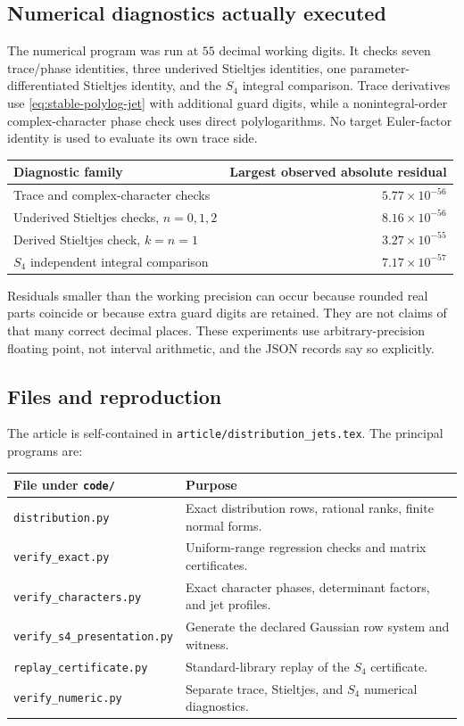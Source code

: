 \documentclass[11pt]{article}
\numberwithin{equation}{section}
\theoremstyle{definition}
\theoremstyle{remark}
\newcommand{\code}[1]{\texttt{\small #1}}
\begin{document}
\subsection{Numerical diagnostics actually executed}
The numerical program was run at $55$ decimal working digits. It checks
seven trace/phase identities, three underived Stieltjes identities, one
parameter-differentiated Stieltjes identity, and the $S_4$ integral
comparison. Trace derivatives use \eqref{eq:stable-polylog-jet} with
additional guard digits, while a nonintegral-order complex-character
phase check uses direct polylogarithms. No target Euler-factor identity
is used to evaluate its own trace side.

\begin{center}
\begin{tabular}{p{}r}
\toprule
Diagnostic family & Largest observed absolute residual\\\midrule
Trace and complex-character checks & $5.77\times10^{-56}$\\
Underived Stieltjes checks, $n=0,1,2$ & $8.16\times10^{-56}$\\
Derived Stieltjes check, $k=n=1$ & $3.27\times10^{-55}$\\
$S_4$ independent integral comparison & $7.17\times10^{-57}$\\
\bottomrule
\end{tabular}
\end{center}

Residuals smaller than the working precision can occur because rounded
real parts coincide or because extra guard digits are retained. They
are not claims of that many correct decimal places. These experiments
use arbitrary-precision floating point, not interval arithmetic, and
the JSON records say so explicitly.

\subsection{Files and reproduction}
The article is self-contained in \code{article/distribution\_jets.tex}.
The principal programs are:
\begin{center}
\begin{tabular}{p{}p{}}
\toprule
File under \code{code/} & Purpose\\\midrule
\code{distribution.py} & Exact distribution rows, rational ranks, finite normal forms.\\
\code{verify\_exact.py} & Uniform-range regression checks and matrix certificates.\\
\code{verify\_characters.py} & Exact character phases, determinant factors, and jet profiles.\\
\code{verify\_s4\_presentation.py} & Generate the declared Gaussian row system and witness.\\
\code{replay\_certificate.py} & Standard-library replay of the $S_4$ certificate.\\
\code{verify\_numeric.py} & Separate trace, Stieltjes, and $S_4$ numerical diagnostics.\\
\bottomrule
\end{tabular}
\end{center}
\end{document}
